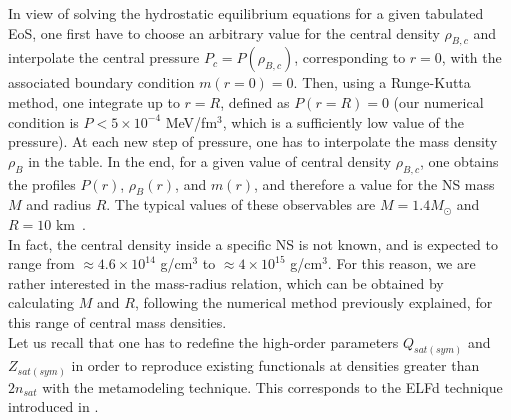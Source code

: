 In view of solving the hydrostatic equilibrium equations for a given tabulated 
EoS, one first have to choose an arbitrary value for the central density 
$\rho_{B,c}$ and 
interpolate the central pressure $P_c = P(\rho_{B,c})$, corresponding to $r=0$, 
with the associated boundary condition $m(r=0) = 0$. Then, using a Runge-Kutta 
method, one integrate up to $r=R$, defined as $P(r=R) = 0$ (our numerical 
condition is $P < 5\times 10^{-4}$ MeV/fm$^{3}$, which is a sufficiently low 
value of the pressure). At each new step of pressure, one has to interpolate 
the mass density $\rho_B$ in the table. In the end, for a given value of 
central density $\rho_{B,c}$, one obtains the profiles $P(r)$, $\rho_B(r)$, 
and $m(r)$, and therefore a value for the NS mass $M$ and radius $R$. The 
typical values of these observables are $M=1.4M_\odot$ and $R=10$ 
km~\cite{Haensel2007}.\\
In fact, the central density inside a specific NS is not known, and is expected
to range from $\approx 4.6\times 10^{14}$ g/cm$^3$ to $\approx 4\times 10^{15}$
g/cm$^3$. For this reason, we are rather interested in the mass-radius 
relation, which can be obtained by calculating $M$ and $R$, following the 
numerical method previously explained, for this range of central mass 
densities.\\
Let us recall that one has to redefine the high-order parameters $Q_{sat(sym)}$ 
and $Z_{sat(sym)}$ in order to reproduce existing functionals at densities
greater than $2n_{sat}$ with the metamodeling technique. This corresponds to
the ELFd technique introduced in \cite{Margueron2018a}.

